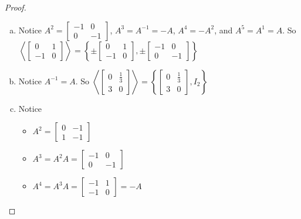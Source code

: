\documentclass{article}
\theoremstyle{definition}
\newcommand{\inv}[1]{#1^{-1}}
\begin{document}
	\begin{proof}
		\begin{enumerate}[(a)]
			\item Notice $A^2=\left[\begin{smallmatrix}
			-1 & 0 \\ 
			0 & -1
			\end{smallmatrix}\right]$, $A^3=\inv{A}=-A$, $A^4=-A^2$, and $A^5=A^1=A$. So $\left\langle\left[\begin{smallmatrix}
			0 & 1 \\ 
			-1 & 0
			\end{smallmatrix}\right]\right\rangle=\left\{\pm\left[\begin{smallmatrix}
			0 & 1 \\ 
			-1 & 0
			\end{smallmatrix}\right],\pm\left[\begin{smallmatrix}
			-1 & 0 \\ 
			0 & -1
			\end{smallmatrix}\right]\right\}$
			
			\item Notice $\inv{A}=A$. So $\left\langle\left[\begin{smallmatrix}
			0 & \frac{1}{3} \\ 
			3 & 0
			\end{smallmatrix} \right]\right\rangle=\left\{\left[\begin{smallmatrix}
			0 & \frac{1}{3} \\ 
			3 & 0
			\end{smallmatrix} \right], I_2\right\}$
			
			\item Notice \begin{multicols}{3}
			\begin{itemize}
				\item $A^2=\left[\begin{smallmatrix}
				0 & -1 \\ 
				1 & -1
				\end{smallmatrix}\right] $
				
				\item $A^3=A^2A=\left[\begin{smallmatrix}
				-1 & 0 \\ 
				0 & -1
				\end{smallmatrix}\right] $
				
				\item $A^4=A^3A=\left[\begin{smallmatrix}
				-1 & 1 \\ 
				-1 & 0
				\end{smallmatrix}\right] =-A$
				

\end{itemize}
\end{multicols}
\end{enumerate}
\end{proof}
\end{document}
